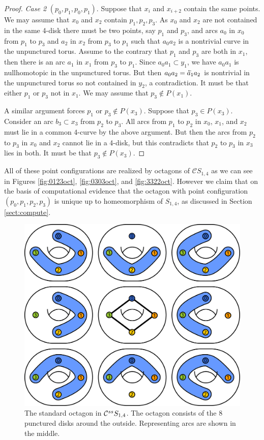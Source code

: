 \begin{proof}
\emph{Case 2} $(p_0,p_1,p_0,p_1)$.
Suppose that $x_{i}$ and $x_{i+2}$ contain the same points.
We may assume that $x_0$ and $x_2$ contain $p_1, p_2, p_3$.
As $x_0$ and $x_2$ are not contained in the same
4-disk there must be two points, say $p_1$ and $p_3$,
and arcs $a_0$ in $x_0$ from $p_1$ to $p_3$
and $a_2$ in $x_2$ from $p_3$ to $p_1$
such that $a_0a_2$ is a nontrivial curve in the unpunctured torus.
Assume to the contrary that $p_1$ and $p_3$ are both in $x_1$,
then there is an arc $a_1$ in $x_1$ from $p_3$ to $p_1$.
Since $a_0a_1 \subset y_1$, we have $a_0a_1$ is nullhomotopic
in the unpunctured torus.
But then $a_0a_2 = \cev{a_1}a_2$ is nontrivial in the unpunctured torus
so not contained in $y_2$, a contradiction.
It must be that either $p_1$ or $p_3$ not in $x_1$.
We may assume that $p_3 \notin P(x_1)$.

A similar argument forces $p_1$ or $p_3 \notin P(x_3)$.
Suppose that $p_3 \in P(x_3)$.
Consider an arc $b_3 \subset x_3$ from $p_2$ to $p_3$.
All arcs from $p_1$ to $p_2$ in $x_0$, $x_1$, and $x_2$
must lie in a common 4-curve by the above argument.
But then the arcs from $p_2$ to $p_3$
in $x_0$ and $x_2$ cannot lie in a 4-disk,
but this contradicts that $p_2$ to $p_3$ in $x_3$ lies in both.
It must be that $p_3 \notin P(x_3)$.
\end{proof}

\begin{remark}
  All of these point configurations are realized by octagons of $\mathcal C S_{1,4}$
  as we can see in Figures
  \ref{fig:0123oct}, \ref{fig:0303oct}, and \ref{fig:3322oct}.
  However we claim that on the basis of computational evidence that
  the
  octagon with point configuration $(p_0,p_1,p_2,p_3)$ is unique up to homeomorphism
  of $S_{1,4}$, as discussed in Section  \ref{sect:compute}.
\end{remark}


\begin{figure}[h!]
  \centering
  \includegraphics[width=.6\textwidth]{figures/standardoctagon.pdf}
  \caption{The standard octagon in $ \mathcal C^{{ss}}  S_{1,4}$. The octagon consists of
  the 8 punctured disks around the outside. Representing arcs are shown in the middle.}
  \label{fig:standardoctagon}
\end{figure}


